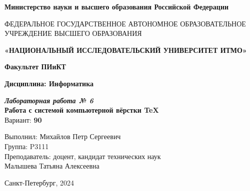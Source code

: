 \thispagestyle{empty}
\begin{center}
    \textbf{\footnotesize Министерство науки и высшего образования Российской Федерации}

    \vspace{1em}
    {\tiny ФЕДЕРАЛЬНОЕ ГОСУДАРСТВЕННОЕ АВТОНОМНОЕ ОБРАЗОВАТЕЛЬНОЕ УЧРЕЖДЕНИЕ ВЫСШЕГО ОБРАЗОВАНИЯ}

    \vspace{1em}
    \textbf{\large «НАЦИОНАЛЬНЫЙ ИССЛЕДОВАТЕЛЬСКИЙ УНИВЕРСИТЕТ ИТМО»}

    \vspace{2em}
    \textbf{Факультет ПИиКТ}

    \vspace{2em}
    \textbf{Дисциплина: Информатика}

    \vspace{16em}
    
    {\Large \textit{\textbf{Лабораторная работа № 6}}}\\[1em]
    {\Large \textbf{Работа с системой компьютерной вёрстки \TeX}}\\[3em]
    Вариант: \textbf{90}
\end{center}

\vspace{10em}

\begin{flushright}
    Выполнил: Михайлов Петр Сергеевич \\
    Группа: P3111 \\
    Преподаватель: доцент, кандидат технических наук \\
    Малышева Татьяна Алексеевна
\end{flushright}
\vspace{6em}

\begin{center}
Санкт-Петербург, 2024
\end{center}